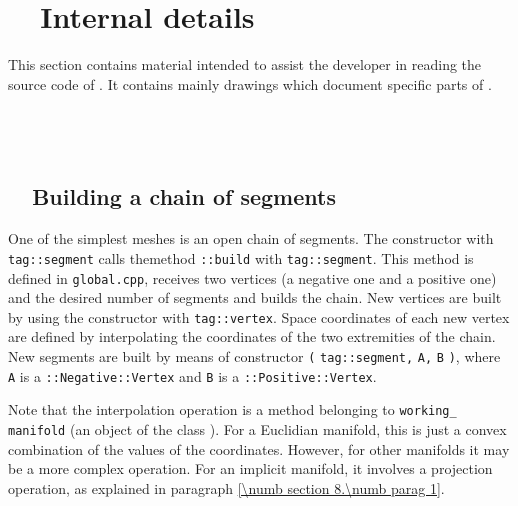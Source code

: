 

\chapter{~~Internal details}\label{\numb section 12}

This section contains material intended to assist the developer in reading the source code
of \maniFEM.
It contains mainly drawings which document specific parts of \maniFEM.


\section{~~\cinza{[empty]}}\label{\numb section 12.\numb parag 1}


\section{~~Building a chain of segments}\label{\numb section 12.\numb parag 2}

One of the simplest meshes is an open chain of segments.
The {\small\tt {}} constructor with {\small\tt \textcolor{tag}{tag}::segment}
calls themethod {\small\tt{}::build} with {\small\tt \textcolor{tag}{tag}::segment}.
This method is defined in
{\small\tt global.cpp}, receives two vertices (a negative one and a positive one)
and the desired number of segments and builds the chain.
New vertices are built by using the {\small\tt {}} constructor with
{\small\tt\textcolor{tag}{tag}::vertex}.
Space coordinates of each new vertex are defined by interpolating the coordinates of the
two extremities of the chain.
New segments are built by means of constructor {\small\tt {}} {\small\tt(}
{\small\tt\textcolor{tag}{tag}::segment,} {\small\tt A,} {\small\tt B} {\small\tt )},
where {\small\tt A} is a {\small\tt {}::Negative::Vertex} and {\small\tt B} is a
{\small\tt {}::Positive::Vertex}.

Note that the interpolation operation is a method belonging to {\small\tt working\_\,manifold}
(an object of the class {\small\tt{}}).
For a Euclidian manifold, this is just a convex combination of the values of the coordinates.
However, for other manifolds it may be a more complex operation.
For an implicit manifold, it involves a projection operation, as explained in paragraph
\ref{\numb section 8.\numb parag 1}.

